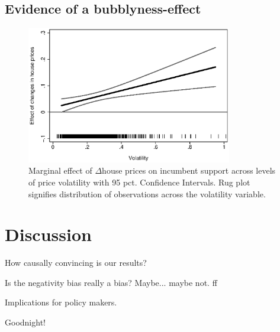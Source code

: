 \documentclass[12pt,a4paper]{article}
\begin{document}


\subsection{Evidence of a  bubblyness-effect}



\begin{figure}
	\includegraphics[width=0.8\textwidth]{../figures/volatilityinteraction.eps}
	\centering
	\caption{Marginal effect of $\Delta$house prices on incumbent support across levels of price volatility with 95 pct. Confidence Intervals. Rug plot signifies distribution of observations across the volatility variable.}
\end{figure}






\section{Discussion}

How causally convincing is our results?

Is the negativity bias really a bias? Maybe... maybe not.  ff

Implications for policy makers.

Goodnight!








\clearpage

\singlespacing



\end{document}
